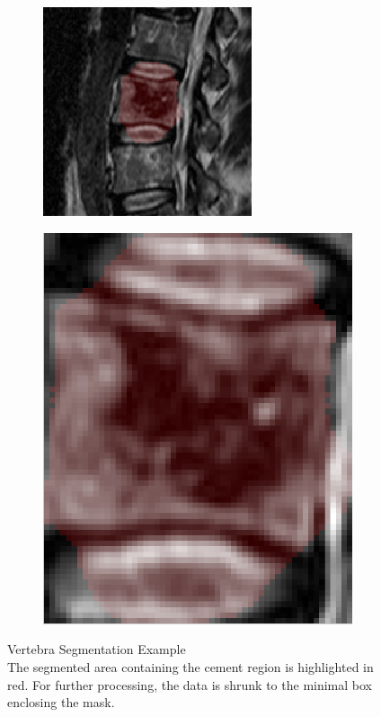 \documentclass{article}
\begin{document}
{    \begin{figure}[h]
      \centering
      \begin{subfigure}[t]{0.45\linewidth}
        \centering
        \includegraphics[scale=1.4]{VertebraSegmentationExample_1.png}
        
      \end{subfigure}
      \hfill
      \begin{subfigure}[t]{0.45\linewidth}
        \centering
        \includegraphics[scale=0.4]{VertebraSegmentationExample_2.png}
      \end{subfigure}
      \caption{Vertebra Segmentation Example\\
        The segmented area containing the cement region is highlighted in red. For further processing, the data is shrunk to the minimal box enclosing the mask.}
    \end{figure} 
  }	
  
\end{document}
